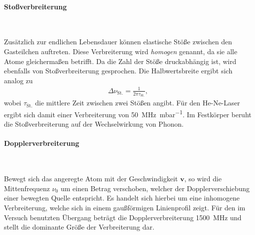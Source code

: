 \documentclass[a4paper,twoside,final]{article}
\begin{document}
\paragraph{Stoßverbreiterung}$~$

Zusätzlich zur endlichen Lebensdauer können elastische Stöße zwischen den Gasteilchen auftreten. Diese Verbreiterung wird \emph{homogen} genannt, da sie alle Atome gleichermaßen betrifft. Da die Zahl der Stöße druckabhängig ist, wird ebenfalls von Stoßverbreiterung gesprochen. Die Halbwertsbreite ergibt sich analog zu
\begin{align}
    \Delta \nu_\text{St.} = \frac{1}{2\pi \tau_\text{St.}},
\end{align}
wobei $\tau_\text{St.}$ die mittlere Zeit zwischen zwei Stößen angibt. Für den He-Ne-Laser ergibt sich damit einer Verbreiterung von \SI{50}{\mega\hertz\per\milli\bar}.
Im Festkörper beruht die Stoßverbreiterung auf der Wechselwirkung von Phonon.

\paragraph{Dopplerverbreiterung}$~$

Bewegt sich das angeregte Atom mit der Geschwindigkeit $\bm{v}$, so wird die Mittenfrequenz $\nu_0$ um einen Betrag verschoben, welcher der Dopplerverschiebung einer bewegten Quelle entspricht. Es handelt sich hierbei um eine inhomogene Verbreiterung, welche sich in einem gaußförmigen Linienprofil zeigt. Für den im Versuch benutzten Übergang beträgt die Dopplerverbreiterung \SI{1500}{\mega\hertz} und stellt die dominante Größe der Verbreiterung dar.
\end{document}
